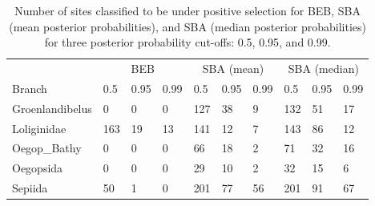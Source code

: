 \documentclass[12pt,letterpaper]{article}\usepackage[]{graphicx}\usepackage[]{color}
\begin{document}
\begin{table}[!ht]
  \centering
  \begin{tabular}{*{10}l}
    \toprule
    & \multicolumn{3}{c}{BEB} & \multicolumn{3}{c}{SBA (mean)} & \multicolumn{3}{c}{SBA (median)}  \\
    \cmidrule(lr){2-4} \cmidrule(lr){5-7} \cmidrule(lr){8-10}
    Branch             & 0.5 & 0.95 & 0.99 & 0.5 & 0.95 & 0.99 & 0.5 & 0.95 & 0.99 \\
    \cmidrule(lr){1-1} \cmidrule(lr){2-2} \cmidrule(lr){3-3} \cmidrule(lr){4-4} \cmidrule(lr){5-5} \cmidrule(lr){6-6} \cmidrule(lr){7-7} \cmidrule(lr){8-8} \cmidrule(lr){9-9} \cmidrule(lr){10-10}
    Groenlandibelus    & 0   & 0    & 0   & 127  & 38   & 9    & 132 & 51   & 17   \\
    Loliginidae        & 163 & 19   & 13  & 141  & 12   & 7    & 143 & 86   & 12   \\
    Oegop\_Bathy       & 0   & 0    & 0   & 66   & 18   & 2    & 71  & 32   & 16   \\
    Oegopsida          & 0   & 0    & 0   & 29   & 10   & 2    & 32  & 15   & 6    \\
    Sepiida            & 50  & 1    & 0   & 201  & 77   & 56   & 201 & 91   & 67   \\
    \bottomrule
  \end{tabular}
  \caption{Number of sites classified to be under positive selection for BEB, SBA (mean posterior probabilities), and SBA (median posterior probabilities) for three posterior probability cut-offs: 0.5, 0.95, and 0.99.}
  \label{tab:brs-sites}
\end{table}
\end{document}
